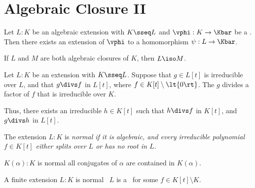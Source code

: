 \documentclass[a4paper]{article}
\begin{document}
\section{Algebraic Closure II}
\begin{ttheorem}
  Let \( L:K \) be an algebraic extension with \( K\sseq L \) and \( \vphi:K\to\Kbar \) be a \homo.
  Then there exists an extension of \( \vphi \) to a homomorphism \( \psi:L\to\Kbar \).
\end{ttheorem}

\begin{ttheorem}
  If \( L \) and \( M \) are both algebraic closures of \( K \), then \( L \iso M \).
\end{ttheorem}

\begin{tcorollary}
  Let \( L:K \) be an extension with \( K\sseq L \).
  Suppose that \( g\in L[t] \) is irreducible over \( L \), and that \( g\divs f \) in \( L[t] \), where \( f\in K[t]\setminus \lt\{ 0 \rt\} \).
  The \( g \) divides a factor of \( f \) that is irreducible over \( K \).

  Thus, there exists an irreducible \( h\in K[t] \) such that \( h\divs f \) in \( K[t] \), and \( g\divs h \) in \( L[t] \).
\end{tcorollary}

\begin{tdefinition}
  The extension \( L:K \) is \it{normal} if it is algebraic, and every irreducible polynomial \( f\in K[t] \) either splits over \( L \) or has no root in \( L \).
\end{tdefinition}

\begin{ttheorem}
  \( K(\alpha):K \) is normal \iff all conjugates of \( \alpha \) are contained in \( K(\alpha) \).
\end{ttheorem}

\begin{ttheorem}
  A finite extension \( L:K \) is normal \iff~\( L \) is a \sfe~for some \( f\in K[t]\setminus K \).
\end{ttheorem}
\end{document}

